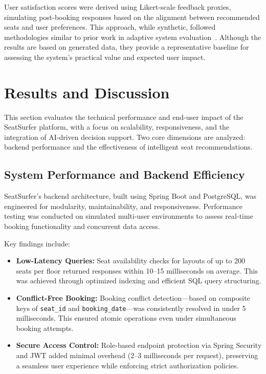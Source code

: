 \documentclass[onecolumn, 12pt]{IEEEtran}
\begin{document}
User satisfaction scores were derived using Likert-scale feedback proxies, simulating post-booking responses based on the alignment between recommended seats and user preferences. This approach, while synthetic, followed methodologies similar to prior work in adaptive system evaluation~\cite{andersen2023ux,li2023cognitive}. Although the results are based on generated data, they provide a representative baseline for assessing the system's practical value and expected user impact.

\section{Results and Discussion}

This section evaluates the technical performance and end-user impact of the SeatSurfer platform, with a focus on scalability, responsiveness, and the integration of AI-driven decision support. Two core dimensions are analyzed: backend performance and the effectiveness of intelligent seat recommendations.

\subsection{System Performance and Backend Efficiency}

SeatSurfer's backend architecture, built using Spring Boot and PostgreSQL, was engineered for modularity, maintainability, and responsiveness. Performance testing was conducted on simulated multi-user environments to assess real-time booking functionality and concurrent data access.

Key findings include:

\begin{itemize}
    \item \textbf{Low-Latency Queries:} Seat availability checks for layouts of up to 200 seats per floor returned responses within 10--15 milliseconds on average. This was achieved through optimized indexing and efficient SQL query structuring.
    
    \item \textbf{Conflict-Free Booking:} Booking conflict detection—based on composite keys of \texttt{seat\_id} and \texttt{booking\_date}—was consistently resolved in under 5 milliseconds. This ensured atomic operations even under simultaneous booking attempts.
    
    \item \textbf{Secure Access Control:} Role-based endpoint protection via Spring Security and JWT added minimal overhead (2--3 milliseconds per request), preserving a seamless user experience while enforcing strict authorization policies.
\end{itemize}
\end{document}
